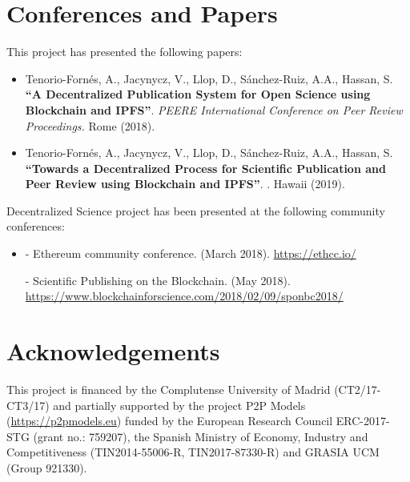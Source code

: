 \section{Conferences and Papers}
\label{sec:conferences-papers}

This project has presented the following papers:

\begin{itemize}
\item Tenorio-Fornés, A., Jacynycz, V., Llop, D., Sánchez-Ruiz, A.A., Hassan, S.
  \textbf{``A Decentralized Publication System for Open Science using Blockchain
    and IPFS''}. \emph{PEERE International Conference on Peer Review
    Proceedings.} Rome (2018).

\item Tenorio-Fornés, A., Jacynycz, V., Llop, D., Sánchez-Ruiz, A.A., Hassan, S.
  \textbf{``Towards a Decentralized Process for Scientific Publication and Peer
    Review using Blockchain and IPFS''}. . Hawaii (2019).

\end{itemize}
\clearpage
Decentralized Science project has been presented at the following community
conferences:

\begin{itemize}
\item {} - Ethereum community conference.  (March
  2018). \url{https://ethcc.io/}

   - Scientific Publishing on the Blockchain.  (May 2018).
  \url{https://www.blockchainforscience.com/2018/02/09/sponbc2018/}

\end{itemize}

\section{Acknowledgements}

This project is financed by the Complutense University of Madrid (CT2/17-CT3/17)
and partially supported by the project P2P Models (\url{https://p2pmodels.eu})
funded by the European Research Council ERC-2017-STG (grant no.: 759207),
the Spanish Ministry of Economy, Industry and Competitiveness (TIN2014-55006-R,
TIN2017-87330-R) and GRASIA UCM (Group 921330). \cleardoublepage



\clearpage



